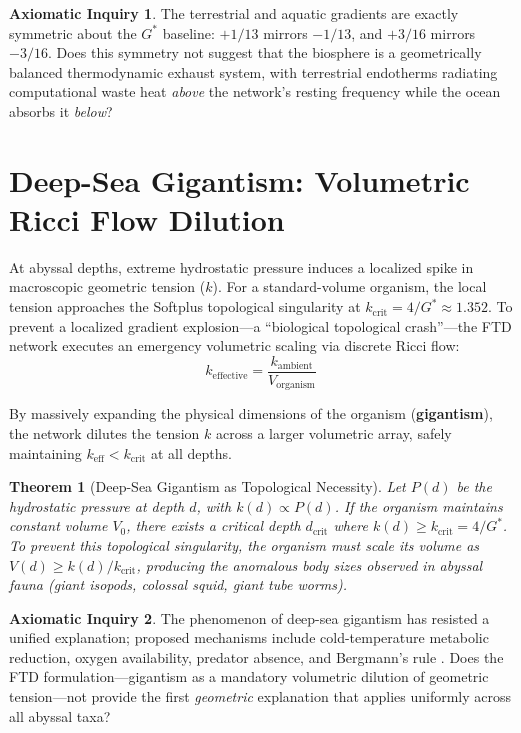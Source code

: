 \documentclass[11pt, letterpaper]{article}
\newcommand{\G}{G^*}
\newtheorem{theorem}{Theorem}[section]
\theoremstyle{definition}
\newtheorem{inquiry}{Axiomatic Inquiry}[section]
\theoremstyle{remark}
\begin{document}
\begin{inquiry}
The terrestrial and aquatic gradients are exactly symmetric about the $\G$ baseline: $+1/13$ mirrors $-1/13$, and $+3/16$ mirrors $-3/16$. Does this symmetry not suggest that the biosphere is a geometrically balanced thermodynamic exhaust system, with terrestrial endotherms radiating computational waste heat \textit{above} the network's resting frequency while the ocean absorbs it \textit{below}?
\end{inquiry}

\section{Deep-Sea Gigantism: Volumetric Ricci Flow Dilution}

At abyssal depths, extreme hydrostatic pressure induces a localized spike in macroscopic geometric tension ($k$). For a standard-volume organism, the local tension approaches the Softplus topological singularity at $k_{\text{crit}} = 4/\G \approx 1.352$. To prevent a localized gradient explosion---a ``biological topological crash''---the FTD network executes an emergency volumetric scaling via discrete Ricci flow:
\begin{equation}
    k_{\text{effective}} = \frac{k_{\text{ambient}}}{V_{\text{organism}}}
\end{equation}

By massively expanding the physical dimensions of the organism (\textbf{gigantism}), the network dilutes the tension $k$ across a larger volumetric array, safely maintaining $k_{\text{eff}} < k_{\text{crit}}$ at all depths.

\begin{theorem}[Deep-Sea Gigantism as Topological Necessity]
Let $P(d)$ be the hydrostatic pressure at depth $d$, with $k(d) \propto P(d)$. If the organism maintains constant volume $V_0$, there exists a critical depth $d_{\text{crit}}$ where $k(d) \geq k_{\text{crit}} = 4/\G$. To prevent this topological singularity, the organism must scale its volume as $V(d) \geq k(d) / k_{\text{crit}}$, producing the anomalous body sizes observed in abyssal fauna (giant isopods, colossal squid, giant tube worms).
\end{theorem}

\begin{inquiry}
The phenomenon of deep-sea gigantism has resisted a unified explanation; proposed mechanisms include cold-temperature metabolic reduction, oxygen availability, predator absence, and Bergmann's rule \cite{Timofeev2001}. Does the FTD formulation---gigantism as a mandatory volumetric dilution of geometric tension---not provide the first \textit{geometric} explanation that applies uniformly across all abyssal taxa?
\end{inquiry}
\end{document}
